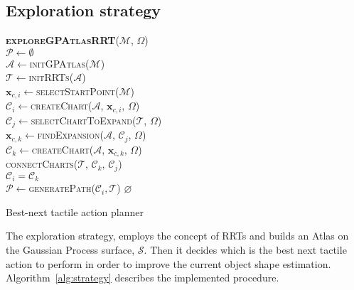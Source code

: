 \subsection{Exploration strategy}
\label{sec:strategy}


\begin{algorithm}[h]
\textbf{\textsc{exploreGPAtlasRRT}}($\mathcal{M}$, $\Omega$)\\ %
\LinesNumbered
\DontPrintSemicolon
\SetAlgoVlined {} 
  $\mathcal{P} \leftarrow \emptyset$ \\
  $\mathcal{A} \leftarrow$\textsc{initGPAtlas}($\mathcal{M}$) \\
  $\mathcal{T} \leftarrow$\textsc{initRRTs}($\mathcal{A}$) \\
  $\mathbf{x}_{c,i} \leftarrow$\textsc{selectStartPoint}($\mathcal{M}$)\\
  $\mathcal{C}_{i} \leftarrow$\textsc{createChart}($\mathcal{A}$, $\mathbf{x}_{c,i}$, $\Omega$)\\
  {
    $\mathcal{C}_{j} \leftarrow$\textsc{selectChartToExpand}($\mathcal{T}$, $\Omega$) \\
    $\mathbf{x}_{c,k} \leftarrow$\textsc{findExpansion}($\mathcal{A}$, $\mathcal{C}_{j}$, $\Omega$) \\ 
    $\mathcal{C}_{k} \leftarrow$\textsc{createChart}($\mathcal{A}$, $\mathbf{x}_{c,k}$, $\Omega$) \\ 
    \textsc{connectCharts}($\mathcal{T}$, $\mathcal{C}_{k}$, $\mathcal{C}_{j}$) \\
    $\mathcal{C}_{i} = \mathcal{C}_{k}$ \\
  }
  {\Return $\mathcal{P} \leftarrow$\textsc{generatePath}($\mathcal{C}_{i}, \mathcal{T}$)}
  {\Return $\varnothing$}
\caption{Best-next tactile action planner} \label{alg:strategy}
\end{algorithm}

The exploration strategy, employs  the concept of RRTs and builds
an Atlas on  the Gaussian Process surface, $\mathcal{S}$. Then  it decides which
is  the  best next  tactile  action  to perform  in  order to improve the  current
object shape estimation.  Algorithm~\ref{alg:strategy}  describes  the
implemented procedure.

